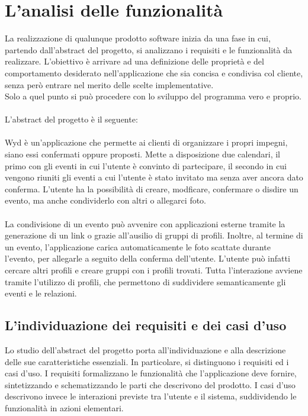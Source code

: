 \chapter{L'analisi delle funzionalità}

La realizzazione di qualunque prodotto software inizia da una fase in cui,
partendo dall’abstract del progetto, si analizzano i requisiti e le funzionalità da realizzare.
L’obiettivo è arrivare ad una definizione delle proprietà e
del comportamento desiderato nell’applicazione che sia concisa e condivisa col cliente,
senza però entrare nel merito delle scelte implementative.\\
Solo a quel punto si può procedere con lo sviluppo del programma vero e proprio.\\
\\
L'abstract del progetto è il seguente:\\
\\
Wyd è un'applicazione che permette ai clienti di organizzare i propri impegni,
siano essi confermati oppure proposti.
Mette a disposizione due calendari,
il primo con gli eventi in cui l'utente è convinto di partecipare,
il secondo in cui vengono riuniti gli eventi a cui l'utente è stato invitato ma senza aver ancora dato conferma.
L'utente ha la possibilità di creare, modficare, confermare o disdire un evento,
ma anche condividerlo con altri o allegarci foto.\\
\\
La condivisione di un evento può avvenire con applicazioni esterne tramite la generazione di un link o
grazie all'ausilio di gruppi di profili.
Inoltre, al termine di un evento, l'applicazione carica automaticamente le foto scattate
durante l'evento, per allegarle a seguito della conferma dell'utente.
L'utente può infatti cercare altri profili e creare gruppi con i profili trovati.
Tutta l'interazione avviene tramite l'utilizzo di profili,
che permettono di suddividere semanticamente gli eventi e le relazioni.
\clearpage

\section{L'individuazione dei requisiti e dei casi d’uso}

Lo studio dell’abstract del progetto porta all’individuazione e
alla descrizione delle sue caratteristiche essenziali.
In particolare, si distinguono i requisiti ed i casi d'uso.
I requisiti formalizzano le funzionalità che l'applicazione deve fornire,
sintetizzando e schematizzando le parti che descrivono del prodotto.
I casi d'uso descrivono invece le interazioni previste tra l'utente e il sistema,
suddividendo le funzionalità in azioni elementari.\\

